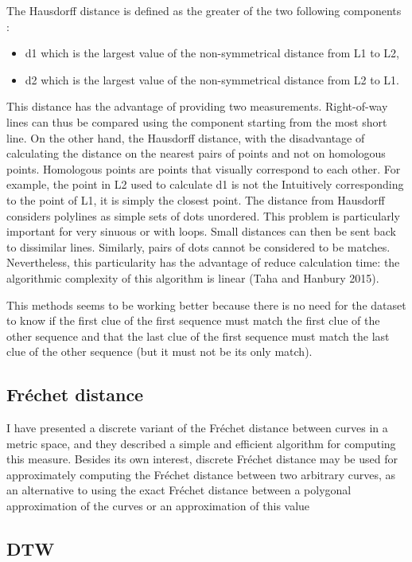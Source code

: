 \documentclass{article}
\begin{document}
The Hausdorff distance is defined as the greater of the two following components :
\begin{itemize}
    \item d1 which is the largest value of the non-symmetrical distance from L1 to L2,
    \item d2 which is the largest value of the non-symmetrical distance from L2 to L1.
\end{itemize}


This distance has the advantage of providing two measurements. Right-of-way lines can thus be compared using the component starting from the most short line. On the other hand, the Hausdorff distance, with the disadvantage of calculating the
distance on the nearest pairs of points and not on homologous points. Homologous points are points that visually correspond to each other. For example, the point in L2 used to calculate d1 is not the Intuitively corresponding to the point of L1, it is simply the closest point. The distance from Hausdorff considers polylines as simple sets of dots unordered. This problem is particularly important for very sinuous or with loops. Small distances can then be sent back to dissimilar lines. Similarly, pairs of dots cannot be considered to be matches. Nevertheless, this particularity has the advantage of
reduce calculation time: the algorithmic complexity of this algorithm is linear (Taha and Hanbury 2015). 


This methods seems to be working better because there is no need for the dataset to know if the first clue of the first sequence must match the first clue of the other sequence and that
the last clue of the first sequence must match the last clue of the other sequence (but it must not be its only match).

\subsection{Fréchet distance}
I have presented a discrete variant of the Fréchet distance between curves in a metric
space, and they described a simple and efficient algorithm for computing this measure.
Besides its own interest, discrete Fréchet distance may be used for approximately computing the Fréchet distance between two arbitrary curves, as an alternative to using the exact Fréchet distance between a polygonal approximation of the curves or an approximation of this value

\subsection{DTW}
\end{document}
